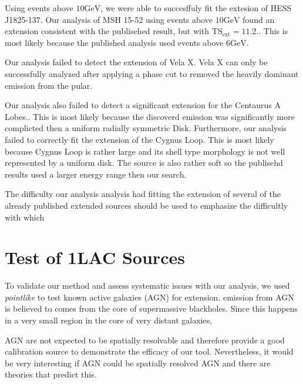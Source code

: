 \documentclass[preprint]{aastex}
\newcommand{\gev}{\text{GeV}\xspace}
\newcommand{\tsext}{\ensuremath{\text{TS}_\text{ext}}\xspace}
\newcommand{\pointlike}{{\em pointlike}\xspace}
\begin{document}
Using events above $10\gev$, we were able to succesffuly fit the extesion
of HESS J1825-137\cite{HESS 1825 paper}. Our analysis of MSH 15-52 using
events above $10\gev$ found an extension consistent with the publisehed
result, but with $\tsext=11.2$.\cite{MSH 15-52 Paper}. This
is most likely because the published analysis used events above $6\gev$.

Our analysis failed to detect the extension of Vela X. Vela X can only be
successfully analyzed after applying a phase cut to removed the heavily
dominant emission from the pular.

Our analysis also failed to detect a significant extension for the
Centaurus A Lobes.\cite{CenA paper}. This is most likely because the
discoverd emission was significantly more complicted then a uniform
radially symmetric Disk.  Furthermore, our analysis failed to correctly
fit the extension of the Cygnus Loop\cite{Cygnus Loop Paper}.  This is
most likely because Cygnus Loop is rather large and its shell type
morphology is not well represented by a uniform disk. The source is
also rather soft so the publisehd results used a larger energy range
then our search.


The difficulty our analysis analysis had fitting the extension of several
of the already published extended sources should be used to emphasize
the difficultly with which

\section{Test of 1LAC Sources}

To validate our method and assess systematic issues with our
analysis, we used \pointlike to test known active galaxies (AGN) for extension.
\gev emission from AGN is believed to comes from the
core of supermassive blackholes. Since this happens in a very small region
in the core of very distant galaxies,

AGN are not expected to be spatially resolvable and therefore
provide a good calibration source to demonstrate the efficacy of our
tool. Nevertheless, it would be very interesting if AGN could be
spatially resolved AGN and there are theories that predict
this\cite{pair_halo_paper, http://adsabs.harvard.edu/doi/10.1086/187222}.
\end{document}
